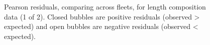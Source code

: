 \documentclass[
]{scrartcl}
\begin{document}
\begin{figure}


\caption{\label{fig-pearsonlenfit1}Pearson residuals, comparing across
fleets, for length composition data (1 of 2). Closed bubbles are
positive residuals (observed \textgreater{} expected) and open bubbles
are negative residuals (observed \textless{} expected).}

\end{figure}%
\end{document}
